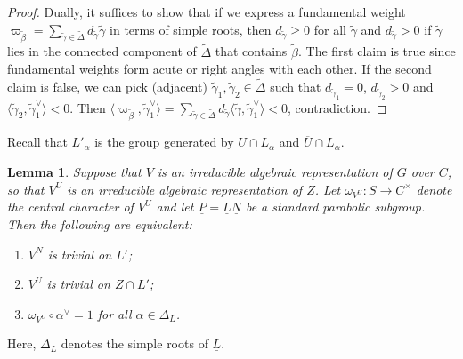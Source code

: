 \documentclass[a4paper]{amsart}
\numberwithin{equation}{section}
\newtheorem{lem}[thm]{Lemma}
\theoremstyle{remark}
\theoremstyle{definition}
\newcommand{\alggrp}[1]{\underline{#1}}
\newcommand{\ang}[1]{\langle #1\rangle}
\begin{document}
\begin{proof}
  Dually, it suffices to show that if we express a fundamental weight $\varpi_{\widetilde{\beta}} = \sum_{\widetilde{\gamma} \in \widetilde{\Delta}} d_{\widetilde{\gamma}} \widetilde{\gamma}$ in terms of simple roots,
  then $d_{\widetilde{\gamma}} \ge 0$ for all $\widetilde{\gamma}$ and $d_{\widetilde{\gamma}} > 0$ if $\widetilde{\gamma}$ lies in the connected component of $\widetilde{\Delta}$ that contains $\widetilde{\beta}$.
  The first claim is true since fundamental weights form acute or right angles with each other. 
  If the second claim is false, we can pick (adjacent) $\widetilde{\gamma}_1, \widetilde{\gamma}_2 \in \widetilde{\Delta}$ such that $d_{\widetilde{\gamma}_1} = 0$, $d_{\widetilde{\gamma}_2} > 0$ and $\ang{\widetilde{\gamma}_2,\widetilde{\gamma}_1^{\vee}} < 0$.
  Then $\ang{\varpi_{\widetilde{\beta}},\widetilde{\gamma}_1^{\vee}} = \sum_{\widetilde{\gamma} \in \widetilde{\Delta}} d_{\widetilde{\gamma}} \ang{\widetilde{\gamma},\widetilde{\gamma}_1^{\vee}} < 0$, contradiction.
\end{proof}

Recall that $L'_{\alpha}$ is the group generated by $U \cap L_{\alpha}$ and $\overline{U} \cap L_{\alpha}$.








\begin{lem}\label{lm:trivial-alg-rep-parab}
  Suppose that $V$ is an irreducible algebraic representation of $G$ over $C$, so that $V^U$ is an irreducible algebraic representation of $Z$. 
  Let $\omega_{V^U} \colon S \to C^{\times}$ denote the central character of $V^U$ and let $\alggrp P = \alggrp L\alggrp N$ be a standard parabolic subgroup.
  Then the following are equivalent:
  \begin{enumerate}
  \item $V^N$ is trivial on $L'$;
  \item $V^U$ is trivial on $Z \cap L'$;
  \item $\omega_{V^U} \circ \alpha^{\vee} = 1$ for all $\alpha \in \Delta_L$.
  \end{enumerate}
\end{lem}

Here, $\Delta_L$ denotes the simple roots of $\alggrp L$.
\end{document}
